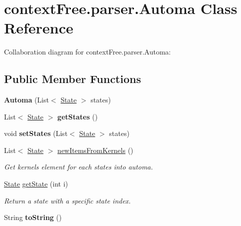 \hypertarget{classcontext_free_1_1parser_1_1_automa}{\section{context\-Free.\-parser.\-Automa Class Reference}
\label{classcontext_free_1_1parser_1_1_automa}
}


Collaboration diagram for context\-Free.\-parser.\-Automa\-:
\subsection*{Public Member Functions}
\begin{DoxyCompactItemize}
\item 
\hypertarget{classcontext_free_1_1parser_1_1_automa_a6a030d3a01bf7ef99b437fcf14727bad}{{\bfseries Automa} (List$<$ \hyperlink{classcontext_free_1_1parser_1_1_state}{State} $>$ states)}\label{classcontext_free_1_1parser_1_1_automa_a6a030d3a01bf7ef99b437fcf14727bad}

\item 
\hypertarget{classcontext_free_1_1parser_1_1_automa_a0a2be97fe40e3035c579b83535649c2e}{List$<$ \hyperlink{classcontext_free_1_1parser_1_1_state}{State} $>$ {\bfseries get\-States} ()}\label{classcontext_free_1_1parser_1_1_automa_a0a2be97fe40e3035c579b83535649c2e}

\item 
\hypertarget{classcontext_free_1_1parser_1_1_automa_a16f74867e919ccddf13441295c80295b}{void {\bfseries set\-States} (List$<$ \hyperlink{classcontext_free_1_1parser_1_1_state}{State} $>$ states)}\label{classcontext_free_1_1parser_1_1_automa_a16f74867e919ccddf13441295c80295b}

\item 
List$<$ \hyperlink{classcontext_free_1_1parser_1_1_state}{State} $>$ \hyperlink{classcontext_free_1_1parser_1_1_automa_ad82cfb3bb6b22d084ef18a95350828b3}{new\-Items\-From\-Kernels} ()
\begin{DoxyCompactList}\small\item\em Get kernels element for each states into automa. \end{DoxyCompactList}\item 
\hyperlink{classcontext_free_1_1parser_1_1_state}{State} \hyperlink{classcontext_free_1_1parser_1_1_automa_a08b46ef04492599b98660a5e55f356bd}{get\-State} (int i)
\begin{DoxyCompactList}\small\item\em Return a state with a specific state index. \end{DoxyCompactList}\item 
\hypertarget{classcontext_free_1_1parser_1_1_automa_a816d25575a45d9a0bbc415a6e0a71a2e}{String {\bfseries to\-String} ()}\label{classcontext_free_1_1parser_1_1_automa_a816d25575a45d9a0bbc415a6e0a71a2e}


\end{DoxyCompactItemize}
